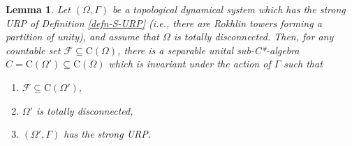 \documentclass[12pt, oneside, psamsfonts]{amsart}
\newtheorem{lem}[thm]{Lemma}
\theoremstyle{definition}
\theoremstyle{remark}
\numberwithin{equation}{section}
\begin{document}
\begin{lem}\label{sep-subalgebra}
Let $(\Omega, \Gamma)$ be a topological dynamical system which has the strong URP of Definition \ref{defn-S-URP} (i.e., there are Rokhlin towers forming  a partition of unity), and assume that $\Omega$ is totally disconnected. Then, for any countable set $\mathcal F \subseteq \mathrm{C}(\Omega)$, there is a separable unital sub-C*-algebra $C=\mathrm{C}(\Omega') \subseteq \mathrm{C}(\Omega)$ which is invariant under the action of $\Gamma$ such that
\begin{enumerate}
\item $\mathcal F \subseteq \mathrm{C}(\Omega')$,
\item $\Omega'$ is totally disconnected,
\item $(\Omega', \Gamma)$ has the strong URP.
\end{enumerate}
\end{lem}
\end{document}
